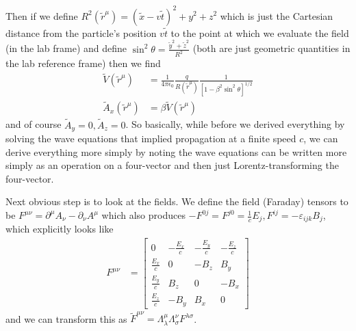 \documentclass[10pt]{report}
\begin{document}
Then if we define $R^2(\tilde{r}^\mu) = (\tilde{x} - v\tilde{t})^2 + y^2 + z^2$ which is just the Cartesian distance from the particle's position $v\tilde{t}$ to the point at which we evaluate the field (in the lab frame) and define $\sin^2\theta = \frac{\tilde{y}^2 + \tilde{z}^2}{R^2}$ (both are just geometric quantities in the lab reference frame) then we find
\begin{align}
    \tilde{V}(\tilde{r}^\mu) &= \frac{1}{4\pi\epsilon_0}\frac{q}{R(\tilde{r}^\mu)}\frac{1}{\left[ 1 - \beta^2 \sin^2\theta \right]^{1/2}}\\
    \tilde{A}_x(\tilde{r}^\mu) &= \beta \tilde{V}(\tilde{r}^\mu)
\end{align}
and of course $\tilde{A}_y = 0, \tilde{A}_z = 0$. So basically, while before we derived everything by solving the wave equations that implied propagation at a finite speed $c$, we can derive everything more simply by noting the wave equations can be written more simply as an operation on a four-vector and then just Lorentz-transforming the four-vector.

Next obvious step is to look at the fields. We define the field (Faraday) tensors to be $F^{\mu \nu} = \partial^\mu A_\nu - \partial_\nu A^\mu$ which also produces $-F^{0j} = F^{j0} = \frac{1}{c}E_j, F^{ij} = -\varepsilon_{ijk}B_j$, which explicitly looks like
\begin{align}
    F^{\mu \nu} &= \begin{bmatrix} 0 & -\frac{E_x}{c} & -\frac{E_y}{c} & -\frac{E_z}{c}\\[10pt]
        \frac{E_x}{c} & 0 & -B_z & B_y\\[10pt]
        \frac{E_y}{c} & B_z & 0 & -B_x\\[10pt]
        \frac{E_z}{c} & -B_y & B_x & 0\end{bmatrix} 
\end{align}
and we can transform this as $\tilde{F}^{\mu \nu} = \Lambda^\mu_\lambda\Lambda^\nu_\sigma F^{\lambda \sigma}$. 
\end{document}
